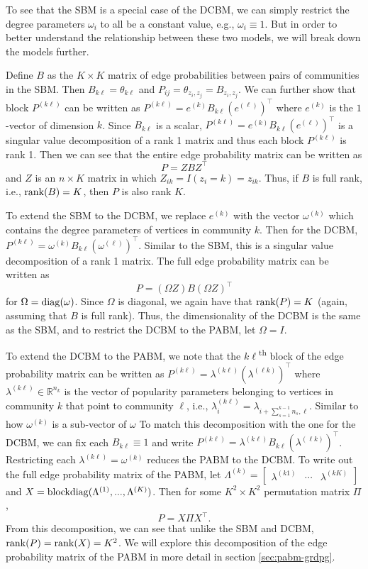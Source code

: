 \documentclass[
  11pt,
]{article}
\theoremstyle{definition}
\theoremstyle{definition}
\theoremstyle{definition}
\theoremstyle{definition}
\theoremstyle{remark}
\begin{document}
To see that the SBM is a special case of the DCBM, we can simply restrict the degree parameters \(\omega_i\) to all be a constant value, e.g., \(\omega_i \equiv 1\).
But in order to better understand the relationship between these two models, we will break down the models further.

Define \(B\) as the \(K \times K\) matrix of edge probabilities between pairs of communities in the SBM.
Then \(B_{k \ell} = \theta_{k \ell}\) and \(P_{ij} = \theta_{z_i, z_j} = B_{z_i, z_j}\).
We can further show that block \(P^{(k \ell)}\) can be written as \(P^{(k \ell)} = e^{(k)} B_{k \ell} (e^{(\ell)})^\top\) where \(e^{(k)}\) is the \(1\)-vector of dimension \(k\).
Since \(B_{k \ell}\) is a scalar, \(P^{(k \ell)} = e^{(k)} B_{k \ell} (e^{(\ell)})^\top\) is a singular value decomposition of a rank 1 matrix and thus each block \(P^{(k \ell)}\) is rank 1.
Then we can see that the entire edge probability matrix can be written as
\[P = Z B Z^\top\]
and \(Z\) is an \(n \times K\) matrix in which \(Z_{ik} = I(z_i = k) = z_{ik}\). Thus, if \(B\) is full rank, i.e., \(\mathrm{rank}(B) = K\), then \(P\) is also rank \(K\).

To extend the SBM to the DCBM, we replace \(e^{(k)}\) with the vector \(\omega^{(k)}\) which contains the degree parameters of vertices in community \(k\).
Then for the DCBM, \(P^{(k \ell)} = \omega^{(k)} B_{k \ell} (\omega^{(\ell)})^\top\).
Similar to the SBM, this is a singular value decomposition of a rank 1 matrix.
The full edge probability matrix can be written as
\[P = (\Omega Z) B (\Omega Z)^\top\]
for \(\Omega = \mathrm{diag}(\omega)\).
Since \(\Omega\) is diagonal, we again have that \(\mathrm{rank}(P) = K\) (again, assuming that \(B\) is full rank).
Thus, the dimensionality of the DCBM is the same as the SBM, and to restrict the DCBM to the PABM, let \(\Omega = I\).

To extend the DCBM to the PABM, we note that the \(k \ell\)\textsuperscript{th} block of the edge probability matrix can be written as \(P^{(k \ell)} = \lambda^{(k \ell)} (\lambda^{(\ell k)})^\top\) where \(\lambda^{(k \ell)} \in \mathbb{R}^{n_k}\) is the vector of popularity parameters belonging to vertices in community \(k\) that point to community \(\ell\), i.e., \(\lambda^{(k \ell)}_i = \lambda_{i + \sum_{s=1}^{k-1} n_s, \ell}\).
Similar to how \(\omega^{(k)}\) is a sub-vector of \(\omega\)
To match this decomposition with the one for the DCBM, we can fix each \(B_{k \ell} \equiv 1\) and write \(P^{(k \ell)} = \lambda^{(k \ell)} B_{k \ell} (\lambda^{(\ell k)})^\top\).
Restricting each \(\lambda^{(k \ell)} = \omega^{(k)}\) reduces the PABM to the DCBM.
To write out the full edge probability matrix of the PABM, let \(\Lambda^{(k)} =\begin{bmatrix} \lambda^{(k1)} & \cdots & \lambda^{(kK)} \end{bmatrix}\) and \(X = \mathrm{blockdiag}(\Lambda^{(1)}, ..., \Lambda^{(K)})\).
Then for some \(K^2 \times K^2\) permutation matrix \(\Pi\),
\[P = X \Pi X^\top.\]
From this decomposition, we can see that unlike the SBM and DCBM, \(\mathrm{rank}(P) = \mathrm{rank}(X) = K^2\).
We will explore this decomposition of the edge probability matrix of the PABM in more detail in section \ref{sec:pabm-grdpg}.
\end{document}

